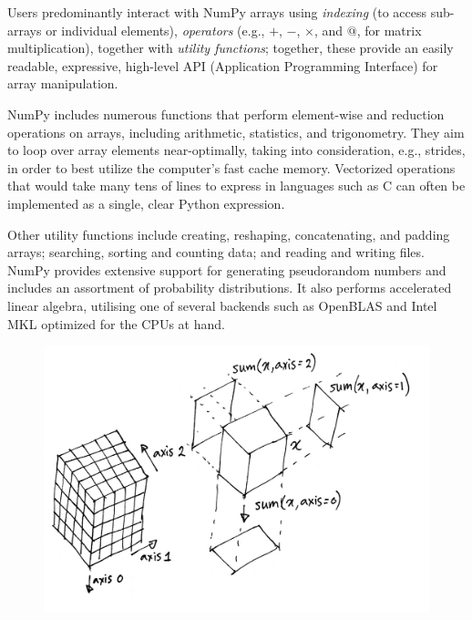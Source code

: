 Users predominantly interact with NumPy arrays using {\em indexing} (to access sub-arrays or individual elements), {\em operators} (e.g., $+$, $-$, $\times$, and $@$, for matrix multiplication), together with {\em utility functions}; together, these provide an easily readable, expressive, high-level API (Application Programming Interface) for array manipulation.

NumPy includes numerous functions that perform element-wise and reduction operations on arrays, including arithmetic, statistics, and trigonometry.  They aim to loop over array elements near-optimally, taking into consideration, e.g., strides, in order to best utilize the computer's fast cache memory.  Vectorized operations that would take many tens of lines to express in languages such as C can often be implemented as a single, clear Python expression.

Other utility functions include creating, reshaping, concatenating, and padding arrays; searching, sorting and counting data; and reading and writing files.  NumPy provides extensive support for generating pseudorandom numbers and includes an assortment of probability distributions. It also performs accelerated linear algebra, utilising one of several backends such as OpenBLAS and Intel MKL optimized for the CPUs at hand.



\begin{figure}
  \centering
  \includegraphics[width=\linewidth]{static/sketches/reductions}
  \caption{
   }
  \label{fig:reductions}
\end{figure}

